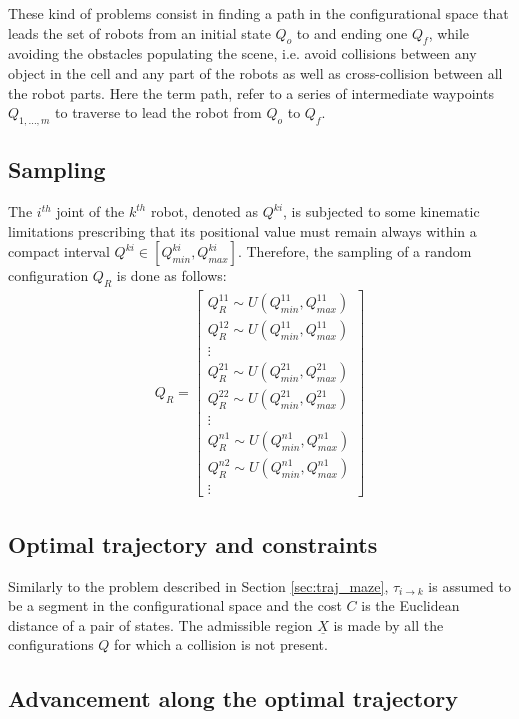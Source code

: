 These kind of problems consist in finding a path in the configurational space that leads the set of robots from an initial state $Q_o$ to and ending one $Q_f$, while avoiding the obstacles populating the scene, i.e. avoid collisions between any object in the cell and any part of the robots as well as cross-collision between all the robot parts. Here the term path, refer to a series of intermediate waypoints $Q_{1,\hdots,m}$ to traverse to lead the robot from $Q_o$ to $Q_f$. 

\subsection{Sampling}

The $i^{th}$ joint of the $k^{th}$ robot, denoted as $Q^{ki}$, is subjected to some kinematic limitations prescribing that its positional value must remain always within a compact interval $Q^{ki} \in [Q^{ki}_{min} , Q^{ki}_{max}]$. Therefore, the sampling of a random configuration $Q_R$ is done as follows:
\begin{eqnarray}
Q_R = \begin{bmatrix} 
Q^{11}_R \sim U(Q^{11}_{min},Q^{11}_{max}) \\
Q^{12}_R \sim U(Q^{11}_{min},Q^{11}_{max}) \\
\vdots \\ 
Q^{21}_R \sim U(Q^{21}_{min},Q^{21}_{max}) \\
Q^{22}_R \sim U(Q^{21}_{min},Q^{21}_{max}) \\
\vdots \\
Q^{n1}_R \sim U(Q^{n1}_{min},Q^{n1}_{max}) \\
Q^{n2}_R \sim U(Q^{n1}_{min},Q^{n1}_{max}) \\
\vdots
\end{bmatrix}
\end{eqnarray}

\subsection{Optimal trajectory and constraints}

Similarly to the problem described in Section \ref{sec:traj_maze}, $\tau_{i \rightarrow k}$ is assumed to be a segment in the configurational space and the cost $C$ is the Euclidean distance of a pair of states.
The admissible region $\underline{X}$ is made by all the configurations $Q$ for which a collision is not present.

\subsection{Advancement along the optimal trajectory}
\label{sec:steer_articulated}

